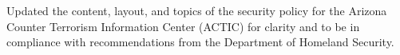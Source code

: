 


\begin{rExperience}

  \item Updated the content, layout, and topics of the security policy for the Arizona Counter Terrorism Information Center (ACTIC) for clarity and to be in compliance with recommendations from the Department of Homeland Security.

\end{rExperience}
